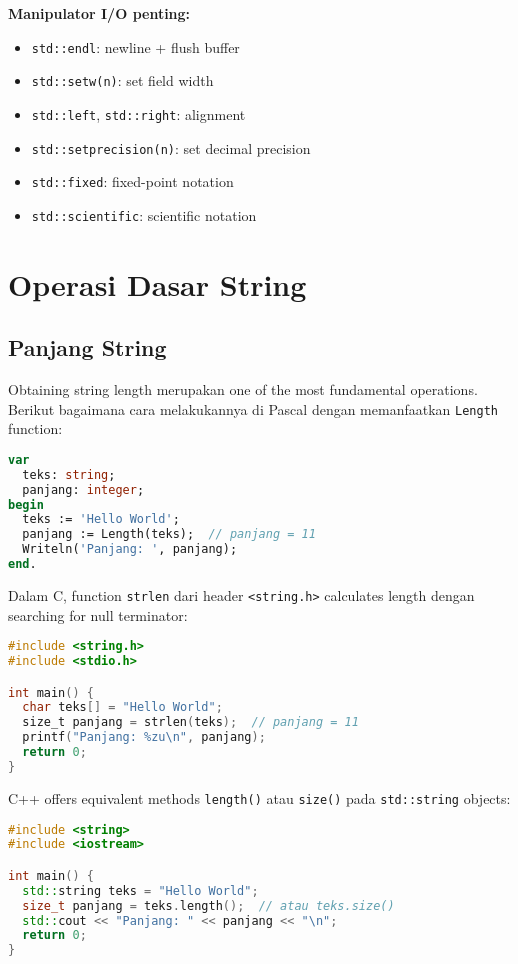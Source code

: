 \documentclass[../main.tex]{subfiles}
\begin{document}
\textbf{Manipulator I/O penting:}
\begin{itemize}
  \item \texttt{std::endl}: newline + flush buffer
  \item \texttt{std::setw(n)}: set field width
  \item \texttt{std::left}, \texttt{std::right}: alignment
  \item \texttt{std::setprecision(n)}: set decimal precision
  \item \texttt{std::fixed}: fixed-point notation
  \item \texttt{std::scientific}: scientific notation
\end{itemize}

\section{Operasi Dasar String}

\subsection{Panjang String}

Obtaining string length merupakan one of the most fundamental operations. Berikut bagaimana cara melakukannya di Pascal dengan memanfaatkan \texttt{Length} function:

\begin{lstlisting}[language=Pascal, caption={Panjang string di Pascal}]
var
  teks: string;
  panjang: integer;
begin
  teks := 'Hello World';
  panjang := Length(teks);  // panjang = 11
  Writeln('Panjang: ', panjang);
end.
\end{lstlisting}

Dalam C, function \texttt{strlen} dari header \texttt{<string.h>} calculates length dengan searching for null terminator:

\begin{lstlisting}[language=C, caption={Panjang string di C}]
#include <string.h>
#include <stdio.h>

int main() {
  char teks[] = "Hello World";
  size_t panjang = strlen(teks);  // panjang = 11
  printf("Panjang: %zu\n", panjang);
  return 0;
}
\end{lstlisting}

C++ offers equivalent methods \texttt{length()} atau \texttt{size()} pada \texttt{std::string} objects:

\begin{lstlisting}[language=C++, caption={Panjang string di C++}]
#include <string>
#include <iostream>

int main() {
  std::string teks = "Hello World";
  size_t panjang = teks.length();  // atau teks.size()
  std::cout << "Panjang: " << panjang << "\n";
  return 0;
}
\end{lstlisting}
\end{document}
